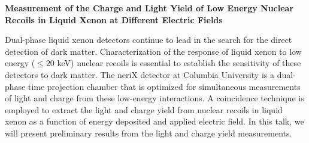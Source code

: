 \documentclass[12pt,a4paper]{article}
\begin{document}
\begin{center}
\textbf{Measurement of the Charge and Light Yield of Low Energy Nuclear Recoils in Liquid Xenon at Different Electric Fields}

Dual-phase liquid xenon detectors continue to lead in the search for the direct detection of dark matter.  Characterization of the response of liquid xenon to low energy ($\leq 20$ keV) nuclear recoils is essential to establish the sensitivity of these detectors to dark matter.  The neriX detector at Columbia University is a dual-phase time projection chamber that is optimized for simultaneous measurements of light and charge from these low-energy interactions.  A coincidence technique is employed to extract the light and charge yield from nuclear recoils in liquid xenon as a function of energy deposited and applied electric field.  In this talk, we will present preliminary results from the light and charge yield measurements.
\end{center}
\end{document}
